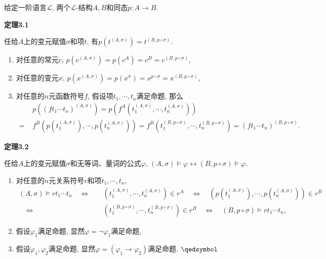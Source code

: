 \documentclass[UTF8]{ctexart}
\begin{document}
给定一阶语言$\mathcal{L}$, 两个$\mathcal{L}$-结构$A,B$和同态$p:A\to B$.

\vspace{10pt}

\hypertarget{sec:定理3.1}{}
\noindent\textbf{定理3.1}

任给$A$上的变元赋值$\sigma$和项$t$, 有$p(t^{(A,\sigma)})=t^{(B,p\circ\sigma)}$.


\begin{enumerate}
    \item 对任意的常元$c$, $p(c^{(A,\sigma)})=p(c^A)=c^B=c^{(B,p\circ\sigma)}$,
    \item 对任意的变元$x$,
    $p(x^{(A,\sigma)})=p(x^\sigma)=x^{p\circ\sigma}=x^{(B,p\circ\sigma)}$,
    \item 对任意的$n$元函数符号$f$, 假设项$t_1,\cdots,t_n$满足命题, 那么
    \begin{equation*}\begin{aligned}
        &p((ft_1\cdots t_n)^{(A,\sigma)})
        =p(f^A(t_1^{(A,\sigma)},\cdots,t_n^{(A,\sigma)}))\\[-3pt]
        =\,\,&f^B(p(t_1^{(A,\sigma)}),\cdots,p(t_n^{(A,\sigma)}))
        =f^B(t_1^{(B,p\circ\sigma)},\cdots,t_n^{(B,p\circ\sigma)})
        =(ft_1\cdots t_n)^{(B,p\circ\sigma)}.
    \end{aligned}\tag*{\qedsymbol}\end{equation*}
\end{enumerate}

\vspace{10pt}

\hypertarget{sec:定理3.2}{}
\noindent\textbf{定理3.2}

任给$A$上的变元赋值$\sigma$和无等词、量词的公式$\varphi$,
$(A,\sigma)\models\varphi\leftrightarrow(B,p\circ\sigma)\models\varphi$.


\begin{enumerate}
    \item 对任意的$n$元关系符号$r$和项$t_1,\cdots,t_n$,
    \[\begin{aligned}
        (A,\sigma)\models rt_1\cdots t_n\quad\iff\quad&
        (t_1^{(A,\sigma)},\cdots,t_n^{(A,\sigma)})\in r^A\quad\iff\quad
        (p(t_1^{(A,\sigma)}),\cdots,p(t_n^{(A,\sigma)}))\in r^B\\[-3pt]
        \quad\iff\quad&(t_1^{(B,p\circ\sigma)},\cdots,t_n^{(B,p\circ\sigma)})\in r^B
        \quad\iff\quad(B,p\circ\sigma)\models rt_1\cdots t_n,
    \end{aligned}\]
    \item 假设$\varphi_1$满足命题, 显然$\varphi=\neg\varphi_1$满足命题,
    \item 假设$\varphi_1,\varphi_2$满足命题,
    显然$\varphi=(\varphi_1\to\varphi_2)$满足命题. \hfill $\qedsymbol$
\end{enumerate}
\end{document}
